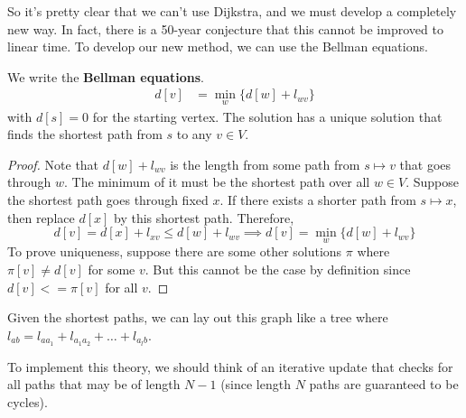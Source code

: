   So it's pretty clear that we can't use Dijkstra, and we must develop a completely new way. In fact, there is a 50-year conjecture that this cannot be improved to linear time. To develop our new method, we can use the Bellman equations.

  \begin{theorem}
    \label{thm:bellman-equations}
    We write the \textbf{Bellman equations}. 
    \begin{align}
      d[v] & = \min_{w} \{ d[w] + l_{w v}\}
    \end{align}
    with $d[s] = 0$ for the starting vertex. The solution has a unique solution that finds the shortest path from $s$ to any $v \in V$.    
  \end{theorem}
  \begin{proof}
    Note that $d[w] + l_{wv}$ is the length from some path from $s \mapsto v$ that goes through $w$. The minimum of it must be the shortest path over all $w \in V$. Suppose the shortest path goes through fixed $x$. If there exists a shorter path from $s \mapsto x$, then replace $d[x]$ by this shortest path. Therefore, 
    \begin{equation}
      d[v] = d[x] + l_{xv} \leq d[w] + l_{wv} \implies d[v] = \min_{w} \{d[w] + l_{w v}\}
    \end{equation}
    To prove uniqueness, suppose there are some other solutions $\pi$ where $\pi[v] \neq d[v]$ for some $v$. But this cannot be the case by definition since $d[v] <= \pi[v]$ for all $v$. 
  \end{proof}

  \begin{theorem}
    \label{thm:shortest-path-tree-layout}
    Given the shortest paths, we can lay out this graph like a tree where $l_{ab} = l_{a a_1} + l_{a_1 a_2} + \ldots + l_{a_l b}$. 
  \end{theorem}

  To implement this theory, we should think of an iterative update that checks for all paths that may be of length $N-1$ (since length $N$ paths are guaranteed to be cycles). 

